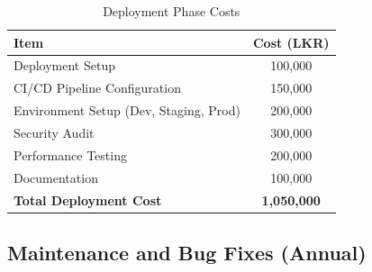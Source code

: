 \documentclass[12pt,a4paper]{article}
\begin{document}
\begin{table}[H]
\centering
\begin{tabular}{|l|c|}
\hline
\textbf{Item} & \textbf{Cost (LKR)} \\
\hline
Deployment Setup & 100,000 \\
CI/CD Pipeline Configuration & 150,000 \\
Environment Setup (Dev, Staging, Prod) & 200,000 \\
Security Audit & 300,000 \\
Performance Testing & 200,000 \\
Documentation & 100,000 \\
\hline
\textbf{Total Deployment Cost} & \textbf{1,050,000} \\
\hline
\end{tabular}
\caption{Deployment Phase Costs}
\end{table}

\subsection{Maintenance and Bug Fixes (Annual)}
\end{document}
